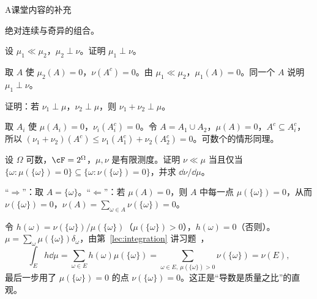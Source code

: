 \begin{exercises}{A}{课堂内容的补充}
\item\label{ex:ac:A4} 绝对连续与奇异的组合。
\begin{questions}
\item 设 $\mu_1\ll\mu_2$，$\mu_2\perp\nu$。证明 $\mu_1\perp\nu$。
\begin{solution}
取 $A$ 使 $\mu_2(A)=0$，$\nu(A^c)=0$。由 $\mu_1\ll\mu_2$，$\mu_1(A)=0$。同一个 $A$ 说明 $\mu_1\perp\nu$。
\end{solution}
\item 证明：若 $\nu_1\perp\mu$，$\nu_2\perp\mu$，则 $\nu_1+\nu_2\perp\mu$。
\begin{solution}
取 $A_i$ 使 $\mu(A_i)=0$，$\nu_i(A_i^c)=0$。令 $A=A_1\cup A_2$，$\mu(A)=0$，$A^c\subseteq A_i^c$，所以 $(\nu_1+\nu_2)(A^c)\leqslant\nu_1(A_1^c)+\nu_2(A_2^c)=0$。可数个的情形同理。
\end{solution}
\end{questions}

\item\label{ex:ac:A5} 设 $\Omega$ 可数，$\cF=2^\Omega$，$\mu,\nu$ 是有限测度。证明 $\nu\ll\mu$ 当且仅当 $\{\omega:\mu(\{\omega\})=0\}\subseteq\{\omega:\nu(\{\omega\})=0\}$，并求 $\dd\nu/\dd\mu$。
\begin{solution}
“$\Rightarrow$”：取 $A=\{\omega\}$。“$\Leftarrow$”：若 $\mu(A)=0$，则 $A$ 中每一点 $\mu(\{\omega\})=0$，从而 $\nu(\{\omega\})=0$，$\nu(A)=\sum_{\omega\in A}\nu(\{\omega\})=0$。

令 $h(\omega)=\nu(\{\omega\})/\mu(\{\omega\})$（$\mu(\{\omega\})>0$），$h(\omega)=0$（否则）。$\mu=\sum_\omega\mu(\{\omega\})\delta_\omega$，由第~\ref{lec:integration} 讲习题~，
\[
\int_Eh\dd\mu=\sum_{\omega\in E}h(\omega)\mu(\{\omega\})=\sum_{\omega\in E,\ \mu(\{\omega\})>0}\nu(\{\omega\})=\nu(E),
\]
最后一步用了 $\mu(\{\omega\})=0$ 的点 $\nu(\{\omega\})=0$。这正是“导数是质量之比”的直观。
\end{solution}


\end{exercises}
